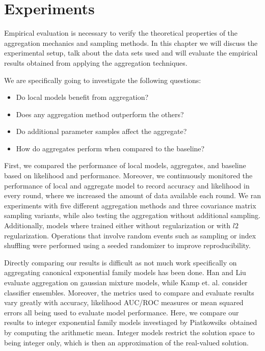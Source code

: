 
\chapter{Experiments}
\label{chapter:ch5}
Empirical evaluation is necessary to verify the theoretical properties of the aggregation mechanics and sampling methods.
In this chapter we will discuss the experimental setup, talk about the data sets used and will evaluate the empirical results obtained from applying the aggregation techniques.

We are specifically going to investigate the following questions:
\begin{itemize}
    \item Do local models benefit from aggregation?
    \item Does any aggregation method outperform the others? 
    \item Do additional parameter samples affect the aggregate?
    \item How do aggregates perform when compared to the baseline?
\end{itemize}
First, we compared the performance of local models, aggregates, and baseline based on likelihood and performance. 
Moreover, we continuously monitored the performance of local and aggregate model to record accuracy and likelihood in every round, where we increased the amount of data available each round.
We ran experiments with five different aggregation methods and three covariance matrix sampling variants, while also testing the aggregation without additional sampling.
Additionally, models where trained either without regularization or with $l2$ regularization.
Operations that involve random events such as sampling or index shuffling were performed using a seeded randomizer to improve reproducibility.

Directly comparing our results is difficult as not much work specifically on aggregating canonical exponential family models has been done. Han and Liu\cite{han2016bootstrap} evaluate aggregation on gaussian mixture models, while Kamp et. al. \cite{kamp2017effective} consider classifier ensembles.
Moreover, the metrics used to compare and evaluate results vary greatly with accuracy, likelihood AUC/ROC measures or mean squared errors all being used to evaluate model performance.
Here, we compare our results to integer exponential family models investiaged by Piatkowsiks~\cite{piatkowski2018exponential}obtained by computing the arithmetic mean. 
Integer models restrict the solution space to being integer only, which is then an approximation of the real-valued solution.

